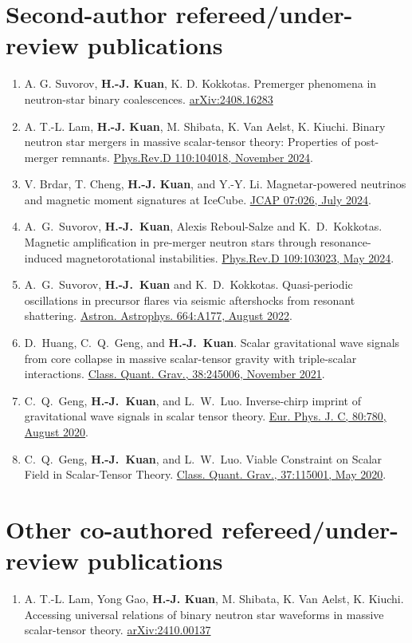 \documentclass[10pt,floatfix,a4paper]{article}
\begin{document}
\section*{Second-author refereed/under-review publications}
\begin{enumerate}
	\item A. G. Suvorov, \textbf{H.-J. Kuan}, K. D. Kokkotas. Premerger phenomena in neutron-star binary coalescences. \href{https://arxiv.org/abs/2408.16283}{arXiv:2408.16283 }
	\item A. T.-L. Lam, \textbf{H.-J. Kuan}, M. Shibata, K. Van Aelst, K. Kiuchi. Binary neutron star mergers in massive scalar-tensor theory: Properties of post-merger remnants. \href{https://journals.aps.org/prd/abstract/10.1103/PhysRevD.110.104018}{Phys.Rev.D 110:104018, November 2024}.
	\item V. Brdar, T. Cheng, \textbf{H.-J. Kuan}, and Y.-Y. Li. Magnetar-powered neutrinos and magnetic moment signatures at IceCube. \href{https://iopscience.iop.org/article/10.1088/1475-7516/2024/07/026}{JCAP 07:026, July 2024}. 
	\item A.~G.~Suvorov, \textbf{H.-J.~Kuan}, Alexis Reboul-Salze and K.~D.~Kokkotas. Magnetic amplification in pre-merger neutron stars through resonance-induced magnetorotational instabilities.  \href{https://journals.aps.org/prd/abstract/10.1103/PhysRevD.109.103023}{Phys.Rev.D 109:103023, May 2024}.
	\item A.~G.~Suvorov, \textbf{H.-J.~Kuan} and K.~D.~Kokkotas. Quasi-periodic oscillations in precursor flares via seismic aftershocks from resonant shattering. \href{https://www.aanda.org/articles/aa/full_html/2022/08/aa44082-22/aa44082-22.html}{Astron. Astrophys. 664:A177, August 2022}.
	\item D.~Huang, C.~Q.~Geng, and \textbf{H.-J.~Kuan}. Scalar gravitational wave signals from core collapse in massive scalar-tensor gravity with triple-scalar interactions. \href{https://doi.org/10.1088/1361-6382/ac35ab}{Class. Quant. Grav., 38:245006, November 2021}.
	\item C.~Q.~Geng, \textbf{H.-J.~Kuan}, and L.~W.~Luo. Inverse-chirp imprint of gravitational wave signals in scalar tensor theory. \href{https://doi.org/10.1140/epjc/s10052-020-8359-y}{Eur. Phys. J. C, 80:780, August 2020}.
	\item C.~Q.~Geng, \textbf{H.-J.~Kuan}, and L.~W.~Luo. Viable Constraint on Scalar Field in Scalar-Tensor Theory.	\href{https://doi.org/10.1088/1361-6382/ab86fb}{Class. Quant. Grav., 37:115001, May 2020}.
\end{enumerate}



\section*{Other co-authored refereed/under-review publications}
\begin{enumerate}
	\item A. T.-L. Lam, Yong Gao, \textbf{H.-J. Kuan}, M. Shibata, K. Van Aelst, K. Kiuchi. Accessing universal relations of binary neutron star waveforms in massive scalar-tensor theory. \href{https://arxiv.org/abs/2410.00137 }{arXiv:2410.00137 }
\end{enumerate}
\end{document}
